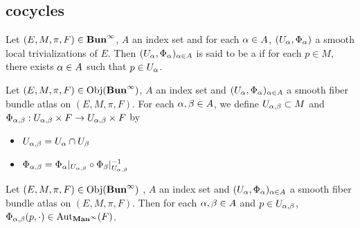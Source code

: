 \documentclass{book}
\begin{document}
	
	
	
	
	
	
	
	
	
	
	
	
	
	
	
	
	
	
	
	
	
	
	
	
	
	
	
	
	
	
	
	
	
	
	











	\subsection{cocycles}
	
	
	
	
	
	\begin{defn} 
		Let $(E, M, \pi, F) \in \operatorname*{\text{\textbf{Bun}}^{\infty}}$, $A$ an index set and for each $\alpha \in A$, $(U_{\alpha}, \Phi_{\alpha})$ a smooth local trivializations of $E$. Then $(U_{\alpha}, \Phi_{\alpha})_{\alpha \in A}$ is said to be a  if for each $p \in M$, there exists $\alpha \in A$ such that $p \in U_{\alpha}$.
	\end{defn}
	
	
	\begin{defn}
		Let $(E, M, \pi, F) \in \operatorname{Obj}(\operatorname*{\text{\textbf{Bun}}^{\infty}})$, $A$ an index set and $(U_{\alpha}, \Phi_{\alpha})_{\alpha \in A}$ a smooth fiber bundle atlas on $(E, M, \pi, F)$. For each $\alpha,\beta \in A$, we define $U_{\alpha,\beta} \subset M$ and $\Phi_{\alpha,\beta}: U_{\alpha,\beta} \times F \rightarrow U_{\alpha,\beta} \times F$ by 
		\begin{itemize}
			\item $U_{\alpha, \beta} = U_{\alpha} \cap U_{\beta}$
			\item $\Phi_{\alpha, \beta} = \Phi_{\alpha}|_{U_{\alpha, \beta}} \circ \Phi_{\beta}|_{U_{\alpha, \beta}}^{-1}$
		\end{itemize}
	\end{defn}
	
	\begin{ex}
		Let $(E, M, \pi, F) \in \operatorname{Obj}(\operatorname*{\text{\textbf{Bun}}^{\infty}})$ , $A$ an index set and $(U_{\alpha}, \Phi_{\alpha})_{\alpha \in A}$ a smooth fiber bundle atlas on $(E, M, \pi, F)$. Then for each $\alpha, \beta \in A$ and $p \in U_{\alpha, \beta}$, $\Phi_{\alpha,\beta}(p, \cdot) \in \operatorname{Aut}_{\operatorname*{\text{\textbf{Man}}^{\infty}}}(F)$.
	\end{ex}
	
\end{document}
